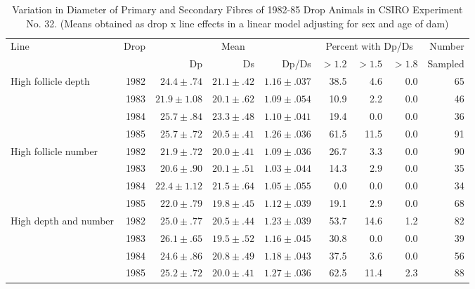 %

\begin{landscape}
\begin{table}
\centering
\caption{Variation in Diameter of Primary and Secondary Fibres of 1982-85 Drop
         Animals in CSIRO Experiment No. 32.
	 (Means obtained as drop x line effects in a linear model adjusting
	  for sex and age of dam)}
\label{tb:5}
\vspace{0.1in}

\begin{tabular}{l|r|rrr|rrr|r}  \hline
 Line & Drop & \multicolumn{3}{c|}{Mean} &  \multicolumn{3}{c|}{Percent with Dp/Ds} &  Number \\ \cline{3-8}
        &       & Dp & Ds & Dp/Ds &   $>1.2$ &  $>1.5$ & $>1.8$ & Sampled \\ \hline


High follicle depth   & 1982   & $24.4\pm.74$  & $21.1\pm.42$  & $1.16\pm.037$  & 38.5  & 4.6  & 0.0 &  65 \\
                      & 1983   & $21.9\pm1.08$ & $20.1\pm.62$  & $1.09\pm.054$  & 10.9  & 2.2  & 0.0 &  46 \\
                      & 1984   & $25.7\pm.84$  & $23.3\pm.48$  & $1.10\pm.041$  & 19.4  & 0.0  & 0.0 &  36 \\
                      & 1985   & $25.7\pm.72$  & $20.5\pm.41$  & $1.26\pm.036$  & 61.5  & 11.5 & 0.0 &  91 \\ \hline

High follicle number  & 1982   & $21.9\pm.72$  & $20.0\pm.41$  & $1.09\pm.036$  & 26.7  & 3.3  & 0.0 &  90 \\
                      & 1983   & $20.6\pm.90$  & $20.1\pm.51$  & $1.03\pm.044$  & 14.3  & 2.9  & 0.0 &  35 \\
                      & 1984   & $22.4\pm1.12$ & $21.5\pm.64$  & $1.05\pm.055$  &  0.0  & 0.0  & 0.0 &  34 \\
                      & 1985   & $22.0\pm.79$  & $19.8\pm.45$  & $1.12\pm.039$  & 19.1  & 2.9  & 0.0 &  68 \\ \hline

High depth and number & 1982   & $25.0\pm.77$  & $20.5\pm.44$  & $1.23\pm.039$  & 53.7  & 14.6 & 1.2 &  82 \\
                      & 1983   & $26.1\pm.65$  & $19.5\pm.52$  & $1.16\pm.045$  & 30.8  & 0.0  & 0.0 &  39 \\
                      & 1984   & $24.6\pm.86$  & $20.8\pm.49$  & $1.18\pm.043$  & 37.5  & 3.6  & 0.0 &  56 \\
                      & 1985   & $25.2\pm.72$  & $20.0\pm.41$  & $1.27\pm.036$  & 62.5  & 11.4 & 2.3 &  88 \\ \hline


\end{tabular}
\end{table}
\end{landscape}
